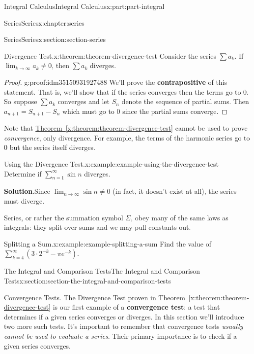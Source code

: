 \documentclass[twoside,10pt,]{tufte-book}
\newcommand{\blocktitlefont}{\relax}
\newcommand{\xreffont}{\relax}
\newcommand{\terminology}[1]{\textbf{#1}}
\numberwithin{equation}{part}
\begin{document}
\begin{partptx}{Integral Calculus}{}{Integral Calculus}{}{}{x:part:part-integral}
\begin{chapterptx}{Series}{}{Series}{}{}{x:chapter:series}
\begin{sectionptx}{Series}{}{Series}{}{}{x:section:section-series}
\begin{theorem}{Divergence Test.}{}{x:theorem:theorem-divergence-test}%
Consider the series \(\sum a_{k}\). If \(\lim_{k\to\infty}a_{k}\neq0\), then \(\sum a_{k}\) diverges.%
\end{theorem}
\begin{proof}{}{g:proof:idm35150931927488}
We'll prove the \terminology{contrapositive} of this statement. That is, we'll show that if the series converges then the terms go to \(0\). So suppose \(\sum a_{k}\) converges and let \(S_{n}\) denote the sequence of partial sums. Then \(a_{n+1} = S_{n+1} - S_{n}\) which must go to \(0\) since the partial sums converge.%
\end{proof}
Note that \hyperref[x:theorem:theorem-divergence-test]{Theorem~{\xreffont\ref{x:theorem:theorem-divergence-test}}} cannot be used to prove \emph{convergence}, only divergence. For example, the terms of the harmonic series go to \(0\) but the series itself diverges.%
\begin{example}{Using the Divergence Test.}{x:example:example-using-the-divergence-test}%
Determine if \(\sum_{n=1}^{\infty}\sin n\) diverges.%
\par\smallskip%
\noindent\textbf{\blocktitlefont Solution}.\hypertarget{g:solution:idm35150931921856}{}\quad{}Since \(\lim_{n\to\infty}\sin n\neq 0\) (in fact, it doesn't exist at all), the series must diverge.%
\end{example}
Series, or rather the summation symbol \(\Sigma\), obey many of the same laws as integrals: they split over sums and we may pull constants out.%
\begin{example}{Splitting a Sum.}{x:example:example-splitting-a-sum}%
Find the value of \(\sum_{k=4}^{\infty}\left(3\cdot2^{-k} - \pi e^{-k}\right)\).%
\end{example}
\end{sectionptx}
%
%
\typeout{************************************************}
\typeout{************************************************}
%
\begin{sectionptx}{The Integral and Comparison Tests}{}{The Integral and Comparison Tests}{}{}{x:section:section-the-integral-and-comparison-tests}
\begin{introduction}{Convergence Tests.}%
The Divergence Test proven in \hyperref[x:theorem:theorem-divergence-test]{Theorem~{\xreffont\ref{x:theorem:theorem-divergence-test}}} is our first example of a \terminology{convergence test}: a test that determines if a given series converges or diverges. In this section we'll introduce two more such tests. It's important to remember that convergence tests \emph{usually cannot be used to evaluate a series}. Their primary importance is to check if a given series converges.%

\end{introduction}
\end{sectionptx}
\end{chapterptx}
\end{partptx}
\end{document}
